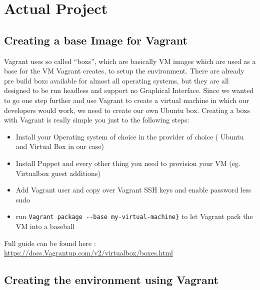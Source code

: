 \section{Actual Project}

\subsection{Creating a base Image for Vagrant}
Vagrant uses so called “\glspl{box}”, which are basically \gls{VM} images which are used as a base for the \gls{VM} Vagrant creates, to setup the environment. There are already pre build \glspl{box} available for almost all operating systems, but they are all designed to be run headless and support no Graphical Interface. Since we wanted to go one step further and use Vagrant to create a virtual machine in which our developers would work, we need to create our own Ubuntu \gls{box}. Creating a \glspl{box} with Vagrant is really simple you just to the following steps:
\begin{itemize}
\item Install your Operating system of choice in the \gls{provider} of choice ( Ubuntu and Virtual Box in our case)
\item Install Puppet and every other thing you need to provision your \gls{VM} (eg. Virtual\gls{box} guest additions)
\item Add Vagrant user and copy over Vagrant SSH keys and enable password less sudo
\item run \verb|Vagrant package --base my-virtual-machine}| to let Vagrant pack the \gls{VM} into a baseball
\end{itemize}
Full guide can be found here : \url{https://docs.Vagrantup.com/v2/virtualbox/boxes.html}



\subsection{Creating the environment using Vagrant}

